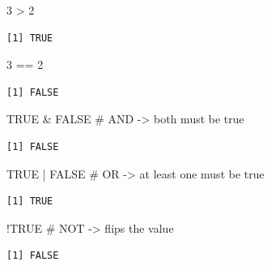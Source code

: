 \documentclass[
  letterpaper,
  DIV=11,
  numbers=noendperiod]{scrartcl}
\newenvironment{Shaded}{\begin{snugshade}}{\end{snugshade}}
\newcommand{\CommentTok}[1]{\textcolor[rgb]{0.37,0.37,0.37}{#1}}
\newcommand{\ConstantTok}[1]{\textcolor[rgb]{0.56,0.35,0.01}{#1}}
\newcommand{\DecValTok}[1]{\textcolor[rgb]{0.68,0.00,0.00}{#1}}
\newcommand{\SpecialCharTok}[1]{\textcolor[rgb]{0.37,0.37,0.37}{#1}}
\begin{document}
\begin{Shaded}
\begin{Highlighting}[]
\DecValTok{3} \SpecialCharTok{\textgreater{}} \DecValTok{2}
\end{Highlighting}
\end{Shaded}

\begin{verbatim}
[1] TRUE
\end{verbatim}

\begin{Shaded}
\begin{Highlighting}[]
\DecValTok{3} \SpecialCharTok{==} \DecValTok{2}
\end{Highlighting}
\end{Shaded}

\begin{verbatim}
[1] FALSE
\end{verbatim}

\begin{Shaded}
\begin{Highlighting}[]
\ConstantTok{TRUE} \SpecialCharTok{\&} \ConstantTok{FALSE}   \CommentTok{\# AND {-}\textgreater{} both must be true}
\end{Highlighting}
\end{Shaded}

\begin{verbatim}
[1] FALSE
\end{verbatim}

\begin{Shaded}
\begin{Highlighting}[]
\ConstantTok{TRUE} \SpecialCharTok{|} \ConstantTok{FALSE}   \CommentTok{\# OR  {-}\textgreater{} at least one must be true}
\end{Highlighting}
\end{Shaded}

\begin{verbatim}
[1] TRUE
\end{verbatim}

\begin{Shaded}
\begin{Highlighting}[]
\SpecialCharTok{!}\ConstantTok{TRUE}          \CommentTok{\# NOT {-}\textgreater{} flips the value}
\end{Highlighting}
\end{Shaded}

\begin{verbatim}
[1] FALSE
\end{verbatim}
\end{document}
